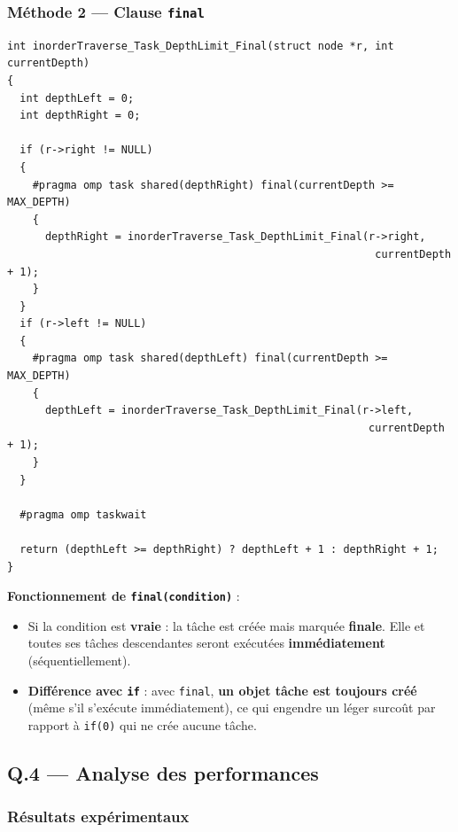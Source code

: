 \documentclass[12pt,a4paper]{article}
\begin{document}
\subsubsection{Méthode 2 --- Clause \texttt{final}}

\begin{lstlisting}[caption={Limite de profondeur avec clause \texttt{final} --- Q.3b}]
int inorderTraverse_Task_DepthLimit_Final(struct node *r, int currentDepth)
{
  int depthLeft = 0;
  int depthRight = 0;

  if (r->right != NULL)
  {
    #pragma omp task shared(depthRight) final(currentDepth >= MAX_DEPTH)
    {
      depthRight = inorderTraverse_Task_DepthLimit_Final(r->right,
                                                          currentDepth + 1);
    }
  }
  if (r->left != NULL)
  {
    #pragma omp task shared(depthLeft) final(currentDepth >= MAX_DEPTH)
    {
      depthLeft = inorderTraverse_Task_DepthLimit_Final(r->left,
                                                         currentDepth + 1);
    }
  }

  #pragma omp taskwait

  return (depthLeft >= depthRight) ? depthLeft + 1 : depthRight + 1;
}
\end{lstlisting}

\textbf{Fonctionnement de \texttt{final(condition)}} :
\begin{itemize}
  \item Si la condition est \textbf{vraie} : la tâche est créée mais marquée
    \textbf{finale}. Elle et toutes ses tâches descendantes seront exécutées
    \textbf{immédiatement} (séquentiellement).
  \item \textbf{Différence avec \texttt{if}} : avec \texttt{final},
    \textbf{un objet tâche est toujours créé} (même s'il s'exécute
    immédiatement), ce qui engendre un léger surcoût par rapport à
    \texttt{if(0)} qui ne crée aucune tâche.
\end{itemize}

\subsection{Q.4 --- Analyse des performances}

\subsubsection{Résultats expérimentaux}
\end{document}
